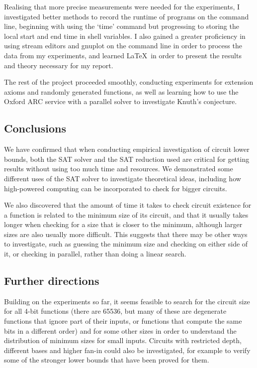 \documentclass{article}
\begin{document}
Realising that more precise measurements were needed for the experiments, I investigated better methods to record the runtime of programs on the command line, beginning with using the `time' command but progressing to storing the local start and end time in shell variables. I also gained a greater proficiency in using stream editors and gnuplot on the command line in order to process the data from my experiments, and learned \LaTeX  \ in order to present the results and theory necessary for my report.

The rest of the project proceeded smoothly, conducting experiments for extension axioms and randomly generated functions, as well as learning how to use the Oxford ARC service with a parallel solver to investigate Knuth's conjecture. 

\subsection{Conclusions}

We have confirmed that when conducting empirical investigation of circuit lower bounds, both the SAT solver and the SAT reduction used are critical for getting results without using too much time and resources. We demonstrated some different uses of the SAT solver to investigate theoretical ideas, including how high-powered computing can be incorporated to check for bigger circuits. 

We also discovered that the amount of time it takes to check circuit existence for a function is related to the minimum size of its circuit, and that it usually takes longer when checking for a size that is closer to the minimum, although larger sizes are also usually more difficult. This suggests that there may be other ways to investigate, such as guessing the minimum size and checking on either side of it, or checking in parallel, rather than doing a linear search.

\subsection{Further directions}

Building on the experiments so far, it seems feasible to search for the circuit size for all 4-bit functions (there are 65536, but many of these are degenerate functions that ignore part of their inputs, or functions that compute the same bits in a different order) and for some other sizes in order to understand the distribution of minimum sizes for small inputs. Circuits with restricted depth, different bases and higher fan-in could also be investigated, for example to verify some of the stronger lower bounds that have been proved for them.
\end{document}
